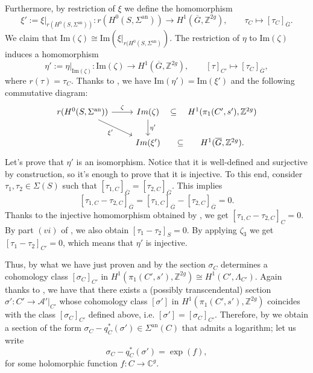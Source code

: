 \documentclass[10 pt,a4paper]{article}
\theoremstyle{plain}
\theoremstyle{definition}
\theoremstyle{named}
\newcommand{\cA}{\mathcal A}
\newcommand{\bC}{\mathbb C}
\newcommand{\bZ}{\mathbb Z}
\DeclareMathOperator{\an}{an}
\begin{document}
    Furthermore, by restriction of $\xi$ we define the homomorphism
    \[
    \xi':=\xi|_{r(H^0(S,\Sigma^{\an}))}: r(H^0(S,\Sigma^{\an})) \to H^1(\overline{G},\bZ^{2g}), \qquad \tau_C \mapsto [\tau_C]_{\overline{G}}.
    \]
    We claim that $\textrm{Im}(\zeta) \cong \textrm{Im}(\xi|_{r(H^0(S,\Sigma^{\an})})$. The restriction of $\eta$ to $\textrm{Im}(\zeta)$ induces a homomorphism
    \[
    \eta':=\eta|_{\textrm{Im}(\zeta)}: \textrm{Im}(\zeta) \to H^1(\overline{G},\bZ^{2g}), \qquad [\tau]_{C'} \mapsto [\tau_C]_{\overline{G}},
    \]
    where $r(\tau)=\tau_C$. Thanks to , we have $\textrm{Im}(\eta') = \textrm{Im}(\xi')$ and the following commutative diagram:
    \[
    \begin{tikzcd}
        r(H^0(S,\Sigma^{\an})) \arrow{r}{\zeta} \arrow[swap]{dr}{\xi'} & \textrm{Im}(\zeta)\arrow{d}{\eta'}\arrow[r, phantom,"\subseteq"] & H^1(\pi_1(C',s'),\bZ^{2g}) \\
         & \textrm{Im}(\xi') \arrow[r, phantom,"\subseteq"] & H^1(\overline{G},\bZ^{2g}).
    \end{tikzcd}
    \]
    Let's prove that $\eta'$ is an isomorphism. Notice that it is well-defined and surjective by construction, so it's enough to prove that it is injective. To this end, consider $\tau_1, \tau_2 \in \Sigma(S)$ such that $[\tau_{1,C}]_{\overline{G}} = [\tau_{2,C}]_{\overline{G}}$. This implies
    \[
    [\tau_{1,C} - \tau_{2,C}]_{\overline{G}} = [\tau_{1,C}]_{\overline{G}} - [\tau_{2,C}]_{\overline{G}} = 0.
    \]
    Thanks to the injective homomorphism obtained by , we get $[\tau_{1,C} - \tau_{2,C}]_{C}=0$. By part $(vi)$ of , we also obtain $[\tau_1 - \tau_2]_S = 0$. By applying $\zeta_3$ we get $[\tau_1 - \tau_2]_{C'}=0$, which means that $\eta'$ is injective.
    
    Thus, by what we have just proven and by  the section $\sigma_C$ determines a cohomology class $[\sigma_C]_{C'}$ in $H^1(\pi_1(C',s'),\bZ^{2g})\cong H^1(C',\Lambda_{C'})$. Again thanks to , we have that there exists a (possibly transcendental) section $\sigma':C' \rightarrow \cA'|_{C'}$ whose cohomology class $[\sigma']$ in $H^1(\pi_1(C',s'),\bZ^{2g})$ coincides with the class $[\sigma_C]_{C'}$ defined above, i.e. $[\sigma']=[\sigma_C]_{C'}$. Therefore, by  we obtain a section of the form $\sigma_C - q_C^*(\sigma') \in \Sigma^{\an}(C)$ that admits a logarithm; let us write
	\begin{equation}\label{equationExp}
		\sigma_C - q_C^*(\sigma') =\exp(f),
	\end{equation}
	for some holomorphic function $f:C \rightarrow \bC^g$.
	
\end{document}
